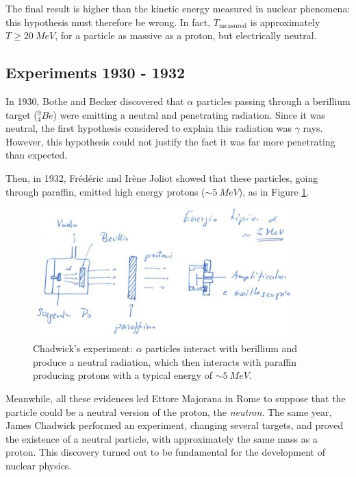 The final result is higher than the kinetic energy measured in nuclear phenomena: this hypothesis must therefore be wrong. In fact, $T_\text{measured}$ is approximately $T \geq 20 \ MeV$, for a particle as massive as a proton, but electrically neutral.

\subsection{Experiments 1930 - 1932}
In 1930, Bothe and Becker discovered that $\alpha$ particles passing through a berillium target ($^9_4Be$) were emitting a neutral and penetrating radiation. Since it was neutral, the first hypothesis considered to explain this radiation was $\gamma$ rays. However, this hypothesis could not justify the fact it was far more penetrating than expected.

Then, in 1932, Frédéric and Irène Joliot showed that these particles, going through paraffin, emitted high energy protons ($\sim \SI{5}{MeV}$), as in Figure \ref{fig:paraffin}. 

\begin{figure}[!h]
    \centering
    \includegraphics[width=0.9\textwidth]{Figures/FNSN16_2.JPG}
    \caption{Chadwick's experiment: $\alpha$ particles interact with berillium and produce a neutral radiation, which then interacts with paraffin producing protons with a typical energy of $\sim \SI{5}{MeV}$.}
    \label{fig:paraffin}
\end{figure} 

Meanwhile, all these evidences led Ettore Majorana in Rome to suppose that the particle could be a neutral version of the proton, the \emph{neutron}. 
The same year, James Chadwick performed an experiment, changing several targets, and proved the existence of a neutral particle, with approximately the same mass as a proton.
This discovery turned out to be fundamental for the development of nuclear physics.

